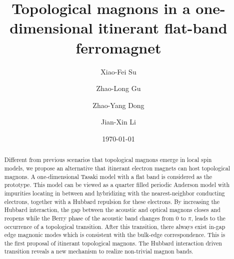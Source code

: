\documentclass[amsmath,superscriptaddress,showpacs,aps,prb,twocolumn]{revtex4-1}
\begin{document}
\title{Topological magnons in a one-dimensional itinerant flat-band ferromagnet}
\author{Xiao-Fei Su}
\author{Zhao-Long Gu}
\author{Zhao-Yang Dong}
\author{Jian-Xin Li}
\date{\today}

\begin{abstract}

\par Different from previous scenarios that topological magnons emerge in local spin models, we propose an alternative that itinerant electron magnets can host topological magnons. A one-dimensional Tasaki model with a flat band is considered as the prototype. This model can be viewed as a quarter filled periodic Anderson model with impurities locating in between and hybridizing with the nearest-neighbor conducting electrons, together with a Hubbard repulsion for these electrons. By increasing the Hubbard interaction, the gap between the acoustic and optical magnons closes and reopens while the Berry phase of the acoustic band changes from 0 to $\pi$, leads to the occurrence of a topological transition. After this transition, there always exist in-gap edge magnonic modes which is consistent with the bulk-edge correspondence. This is the first proposal of itinerant topological magnons. The Hubbard interaction driven transition reveals a new mechanism to realize non-trivial magnon bands.

\end{abstract}

\maketitle
\end{document}
